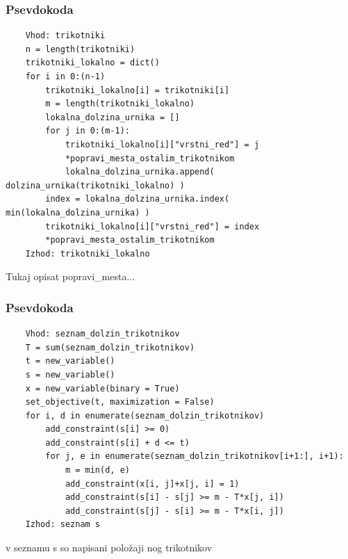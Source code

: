 \documentclass[a4paper,12pt]{article}
\theoremstyle{definition}
\theoremstyle{plain}
\begin{document}
\subsubsection{Psevdokoda}
\begin{verbatim}
    Vhod: trikotniki
    n = length(trikotniki)
    trikotniki_lokalno = dict()
    for i in 0:(n-1)
        trikotniki_lokalno[i] = trikotniki[i]
        m = length(trikotniki_lokalno)
        lokalna_dolzina_urnika = []
        for j in 0:(m-1):
            trikotniki_lokalno[i]["vrstni_red"] = j
            *popravi_mesta_ostalim_trikotnikom
            lokalna_dolzina_urnika.append( dolzina_urnika(trikotniki_lokalno) )
        index = lokalna_dolzina_urnika.index( min(lokalna_dolzina_urnika) )
        trikotniki_lokalno[i]["vrstni_red"] = index
        *popravi_mesta_ostalim_trikotnikom
    Izhod: trikotniki_lokalno

\end{verbatim}


Tukaj opisat popravi\_mesta...


\subsubsection{Psevdokoda}
\begin{verbatim}
    Vhod: seznam_dolzin_trikotnikov
    T = sum(seznam_dolzin_trikotnikov)
    t = new_variable()
    s = new_variable()
    x = new_variable(binary = True)
    set_objective(t, maximization = False)
    for i, d in enumerate(seznam_dolzin_trikotnikov)
        add_constraint(s[i] >= 0)
        add_constraint(s[i] + d <= t)
        for j, e in enumerate(seznam_dolzin_trikotnikov[i+1:], i+1):
            m = min(d, e)
            add_constraint(x[i, j]+x[j, i] = 1)
            add_constraint(s[i] - s[j] >= m - T*x[j, i])
            add_constraint(s[j] - s[i] >= m - T*x[i, j])
    Izhod: seznam s
\end{verbatim}
v seznamu s so napisani položaji nog trikotnikov
\end{document}
